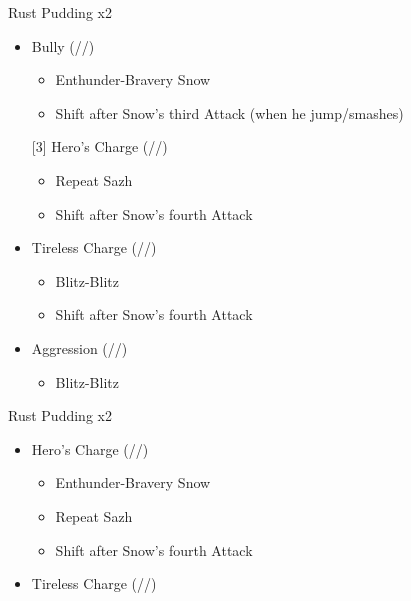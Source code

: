 \begin{paracol}{2}
	\switchcolumn*
	\renewcommand{\first}{[1] }
	\renewcommand{\second}{[2] Devastation (\com/\sab/\com)}
	\renewcommand{\third}{[3] Hero's Charge (\syn/\med/\com)}
	\renewcommand{\fourth}{[4] Tireless Charge (\com/\med/\com)}
	\renewcommand{\fifth}{[5] Bully (\syn/\sab/\com)}
	\renewcommand{\sixth}{[6] Aggression (\com/\rav/\com)}
	\begin{battle}{Rust Pudding x2}
		\begin{itemize}
			\item \fifth
			      \begin{itemize}
				      \item Enthunder-Bravery Snow
				      \item Shift after Snow's third Attack (when he jump/smashes)
			      \end{itemize}
			      \third
			      \begin{itemize}
				      \item Repeat Sazh
				      \item Shift after Snow's fourth Attack
			      \end{itemize}
			\item \fourth
			      \begin{itemize}
				      \item Blitz-Blitz
				      \item Shift after Snow's fourth Attack
			      \end{itemize}
			\item \sixth
			      \begin{itemize}
				      \item Blitz-Blitz
			      \end{itemize}
		\end{itemize}
		\itemdrop{0.3}{Aegisol}
	\end{battle}
	\switchcolumn
	\newpage
	\renewcommand{\second}{[2] Tireless Charge (\com/\med/\com)}
	\renewcommand{\third}{[3] Hero's Charge (\syn/\med/\com)}
	\begin{battle}{Rust Pudding x2}
		\begin{itemize}
			\item \third
			      \begin{itemize}
				      \item Enthunder-Bravery Snow
				      \item Repeat Sazh
				      \item Shift after Snow's fourth Attack
			      \end{itemize}
			\item \second

\end{itemize}
\end{battle}
\end{paracol}
